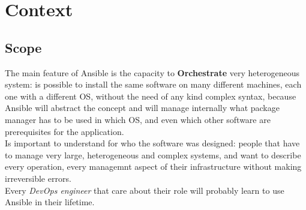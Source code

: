 \documentclass[conference]{IEEEtran}
\begin{document}
\section{Context}
\label{context}
\subsection{Scope}
The main feature of Ansible is the capacity to \textbf{Orchestrate} very heterogeneous system: is possible to install the same software on many different machines, each one with a different OS, without the need of any kind complex syntax, because Ansible will abstract the concept and will manage internally what package manager has to be used in which OS, and even which other software are prerequisites for the application.\\ 
Is important to understand for who the software was designed: people that have to manage very large, heterogeneous and complex systems, and want to describe every operation, every managemnt aspect of their infrastructure without making irreversible errors.\\
Every \textit{DevOps engineer} that care about their role will probably learn to use Ansible in their lifetime. 
\end{document}
